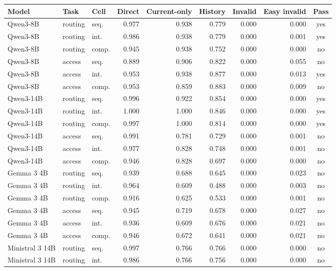 \begin{table}[t]
\centering
\begin{tabular}{@{}lllrrrrrc@{}}
\toprule
Model & Task & Cell & Direct & Current-only & History & Invalid & Easy invalid & Pass \\
\midrule
Qwen3-8B & routing & seq. & 0.977 & 0.938 & 0.779 & 0.000 & 0.000 & yes \\
Qwen3-8B & routing & int. & 0.986 & 0.938 & 0.779 & 0.000 & 0.001 & yes \\
Qwen3-8B & routing & comp. & 0.945 & 0.938 & 0.752 & 0.000 & 0.000 & no \\
Qwen3-8B & access & seq. & 0.889 & 0.906 & 0.822 & 0.000 & 0.055 & no \\
Qwen3-8B & access & int. & 0.953 & 0.938 & 0.877 & 0.000 & 0.013 & yes \\
Qwen3-8B & access & comp. & 0.953 & 0.859 & 0.883 & 0.000 & 0.009 & no \\
Qwen3-14B & routing & seq. & 0.996 & 0.922 & 0.854 & 0.000 & 0.000 & yes \\
Qwen3-14B & routing & int. & 1.000 & 1.000 & 0.846 & 0.000 & 0.000 & yes \\
Qwen3-14B & routing & comp. & 0.997 & 1.000 & 0.814 & 0.000 & 0.000 & yes \\
Qwen3-14B & access & seq. & 0.991 & 0.781 & 0.729 & 0.000 & 0.001 & no \\
Qwen3-14B & access & int. & 0.977 & 0.828 & 0.748 & 0.000 & 0.001 & no \\
Qwen3-14B & access & comp. & 0.946 & 0.828 & 0.697 & 0.000 & 0.000 & no \\
Gemma 3 4B & routing & seq. & 0.939 & 0.688 & 0.645 & 0.000 & 0.023 & no \\
Gemma 3 4B & routing & int. & 0.964 & 0.609 & 0.488 & 0.000 & 0.003 & no \\
Gemma 3 4B & routing & comp. & 0.916 & 0.625 & 0.533 & 0.000 & 0.001 & no \\
Gemma 3 4B & access & seq. & 0.945 & 0.719 & 0.678 & 0.000 & 0.027 & no \\
Gemma 3 4B & access & int. & 0.936 & 0.609 & 0.676 & 0.000 & 0.021 & no \\
Gemma 3 4B & access & comp. & 0.946 & 0.672 & 0.641 & 0.000 & 0.021 & no \\
Ministral 3 14B & routing & seq. & 0.997 & 0.766 & 0.766 & 0.000 & 0.000 & no \\
Ministral 3 14B & routing & int. & 0.986 & 0.766 & 0.756 & 0.000 & 0.000 & no \\

\end{tabular}
\end{table}
